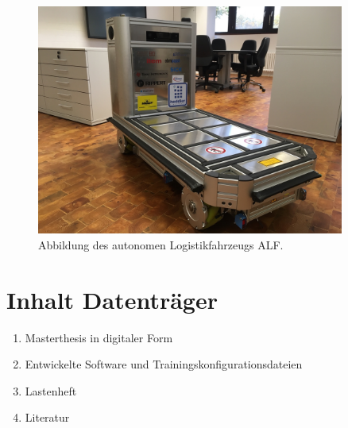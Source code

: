 \documentclass[12pt,a4paper,oneside,numbers=noenddot,headsepline,captions=tableheading,toc=bibliography,openany,tikz,margin=5mm]{scrbook}
\begin{document}
\begin{appendix}
					\begin{figure}[H]
						\centering
						\includegraphics[angle=90,width=0.9\textwidth]{Bilder/Bild.jpeg}
						\caption{Abbildung des autonomen Logistikfahrzeugs ALF.}
						\label{fig: Wirkstruktur Schlupfregelung}
					\end{figure}
					
				
				
				
					\newpage 
					
				
					
					\section{Inhalt Datenträger} 
					\label{dataCD}
					\begin{enumerate}[label=\textbf{\arabic*},ref=A.1.\arabic*]
						\item Masterthesis in digitaler Form
						\label{it: dig}
						\item Entwickelte Software und Trainingskonfigurationsdateien
						\label{it: Software}
						\item Lastenheft
						\label{it: Lastenheft}
						\item Literatur
						
						
					\end{enumerate}
				
		
	\end{appendix}
	
	
\end{document}
